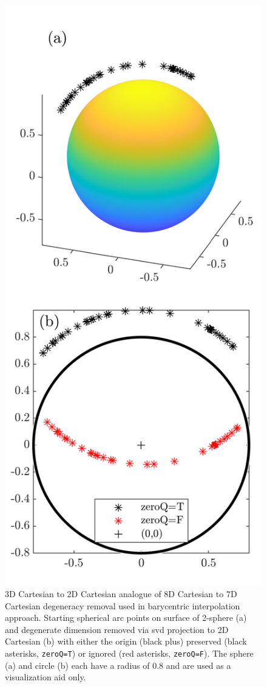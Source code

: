 \documentclass[preprint,12pt]{elsarticle}
\begin{document}
\begin{figure}
    \centering
    \includegraphics{bary-remove-deg.png}
    \caption{3D Cartesian to 2D Cartesian analogue of 8D Cartesian to 7D Cartesian degeneracy removal used in barycentric interpolation approach. Starting spherical arc points on surface of 2-sphere (a) and degenerate dimension removed via \acrlong{svd} projection to 2D Cartesian (b) with either the origin (black plus) preserved (black asterisks, \texttt{zeroQ=T}) or ignored (red asterisks, \texttt{zeroQ=F}). The sphere (a) and circle (b) each have a radius of 0.8 and are used as a visualization aid only.}
    \label{fig:bary-remove-deg}
\end{figure}
\end{document}
